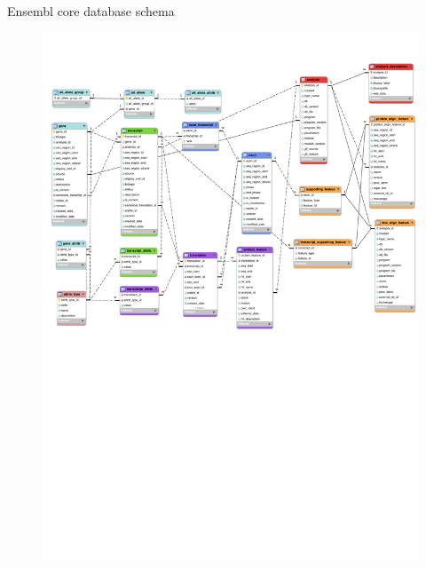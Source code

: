 \documentclass[pdf]{beamer}
\begin{document}
\begin{frame}{Ensembl core database schema}
  \begin{figure}[ht]
    \includegraphics[width=\textwidth]{images/fundamental_tables_core_crop1}
  \end{figure}
\end{frame}
\end{document}
